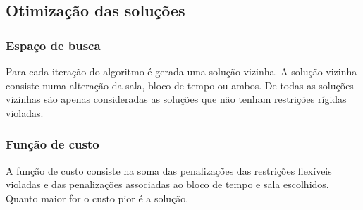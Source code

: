 \subsection{Otimização das soluções}
\label{capitulo3:Otimizador_solucoes}


\subsubsection{Espaço de busca}


Para cada iteração do algoritmo é gerada uma solução vizinha. A solução vizinha consiste numa alteração da sala, bloco de tempo ou ambos. De todas as soluções vizinhas são apenas consideradas as soluções que não tenham restrições rígidas violadas.

\subsubsection{Função de custo}


A função de custo consiste na soma das penalizações das restrições flexíveis violadas e das penalizações associadas ao bloco de tempo e sala escolhidos. Quanto maior for o custo pior é a solução.